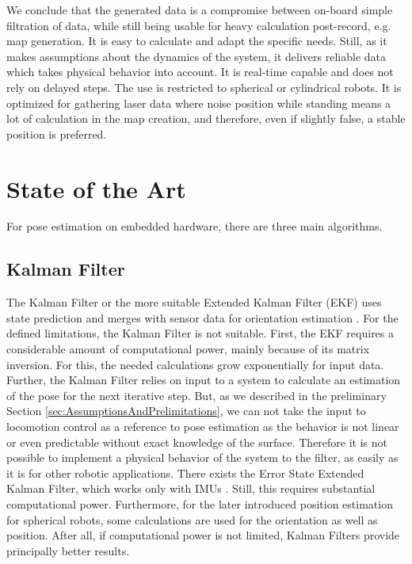 \documentclass[letterpaper, 10 pt, conference]{ieeeconf}  %
\begin{document}
We conclude that the generated data is a compromise between on-board simple filtration of data, while still being usable for heavy calculation post-record, e.g. map generation.
It is easy to calculate and adapt the specific needs.
Still, as it makes assumptions about the dynamics of the system, it delivers reliable data which takes physical behavior into account. 
It is real-time capable and does not rely on delayed steps.
The use is restricted to spherical or cylindrical robots. 
It is optimized for gathering laser data where noise position while standing means a lot of calculation in the map creation, and therefore, even if slightly false, a stable position is preferred.

\section{State of the Art}
\label{sec:SOA}
For pose estimation on embedded hardware, there are three main algorithms.
\subsection{Kalman Filter}
The Kalman Filter or the more suitable Extended Kalman Filter (EKF) uses state prediction and merges with sensor data for orientation estimation \cite{Kalman1960}.
For the defined limitations, the Kalman Filter is not suitable.
First, the EKF requires a considerable amount of computational power, mainly because of its matrix inversion. For this, the needed calculations grow exponentially for input data.
Further, the Kalman Filter relies on input to a system to calculate an estimation of the pose for the next iterative step.
But, as we described in the preliminary Section \ref{sec:AssumptionsAndPrelimitations}, we can not take the input to locomotion control as a reference to pose estimation as the behavior is not linear or even predictable without exact knowledge of the surface.
Therefore it is not possible to implement a physical behavior of the system to the filter, as easily as it is for other robotic applications.
There exists the Error State Extended Kalman Filter, which works only with IMUs \cite{ahmadi2007orientation}.
Still, this requires substantial computational power.
Furthermore, for the later introduced position estimation for spherical robots, some calculations are used for the orientation as well as position.
After all, if computational power is not limited, Kalman Filters provide principally better results.
\end{document}
